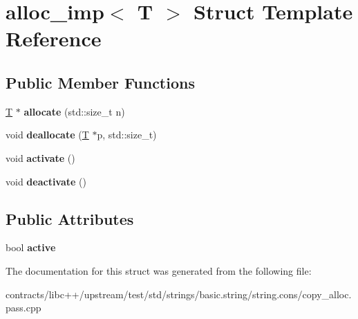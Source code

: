 \hypertarget{structalloc__imp}{}\section{alloc\+\_\+imp$<$ T $>$ Struct Template Reference}
\label{structalloc__imp}
\subsection*{Public Member Functions}
\begin{DoxyCompactItemize}
\item 
\mbox{\label{structalloc__imp_ab515d2ff8d892cfa6d98bb097b94f2cb}} 
\mbox{\hyperlink{struct_t}{T}} $\ast$ {\bfseries allocate} (std\+::size\+\_\+t n)
\item 
\mbox{\label{structalloc__imp_a8c828c29f7f9842183df4812504c0498}} 
void {\bfseries deallocate} (\mbox{\hyperlink{struct_t}{T}} $\ast$p, std\+::size\+\_\+t)
\item 
\mbox{\label{structalloc__imp_a883dd8bfb3f8a8f22bdd2cb01c1b556c}} 
void {\bfseries activate} ()
\item 
\mbox{\label{structalloc__imp_ae9ad0c9c2255250b80d994ac6053f1a6}} 
void {\bfseries deactivate} ()
\end{DoxyCompactItemize}
\subsection*{Public Attributes}
\begin{DoxyCompactItemize}
\item 
\mbox{\label{structalloc__imp_af3fa5f8be7cb567ba88a328b2960bf78}} 
bool {\bfseries active}
\end{DoxyCompactItemize}


The documentation for this struct was generated from the following file\+:\begin{DoxyCompactItemize}
\item 
contracts/libc++/upstream/test/std/strings/basic.\+string/string.\+cons/copy\+\_\+alloc.\+pass.\+cpp\end{DoxyCompactItemize}
